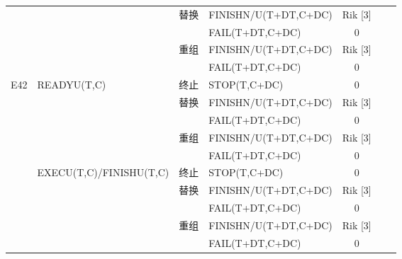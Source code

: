 \begin{table}[htbp]
\begin{tabular}{rrcrcrr}
        \multicolumn{1}{c}{} & \multicolumn{1}{l}{} & \multirow{2}[4]{*}{替换} & \multicolumn{1}{l}{FINISHN/U(T+DT,C+DC)} & Rik  [3] & \multicolumn{1}{c}{\multirow{2}[4]{*}{}} & \multicolumn{1}{c}{\multirow{2}[4]{*}{}} \\
        \multicolumn{1}{c}{} & \multicolumn{1}{l}{} &       & \multicolumn{1}{l}{FAIL(T+DT,C+DC)} & 0     & \multicolumn{1}{c}{} & \multicolumn{1}{c}{} \\
        \multicolumn{1}{c}{} & \multicolumn{1}{l}{} & \multirow{2}[4]{*}{重组} & \multicolumn{1}{l}{FINISHN/U(T+DT,C+DC)} & Rik  [3] & \multicolumn{1}{c}{\multirow{2}[4]{*}{}} & \multicolumn{1}{c}{\multirow{2}[4]{*}{}} \\
        \multicolumn{1}{c}{} & \multicolumn{1}{l}{} &       & \multicolumn{1}{l}{FAIL(T+DT,C+DC)} & 0     & \multicolumn{1}{c}{} & \multicolumn{1}{c}{} \\
        \multicolumn{1}{c}{\multirow{10}[20]{*}{E42}} & \multicolumn{1}{l}{\multirow{5}[10]{*}{READYU(T,C)}} & 终止    & \multicolumn{1}{l}{STOP(T,C+DC)} & 0     &       &  \\
        \multicolumn{1}{c}{} & \multicolumn{1}{l}{} & \multirow{2}[4]{*}{替换} & \multicolumn{1}{l}{FINISHN/U(T+DT,C+DC)} & Rik  [3] & \multicolumn{1}{c}{\multirow{2}[4]{*}{}} & \multicolumn{1}{c}{\multirow{2}[4]{*}{}} \\
        \multicolumn{1}{c}{} & \multicolumn{1}{l}{} &       & \multicolumn{1}{l}{FAIL(T+DT,C+DC)} & 0     & \multicolumn{1}{c}{} & \multicolumn{1}{c}{} \\
        \multicolumn{1}{c}{} & \multicolumn{1}{l}{} & \multirow{2}[4]{*}{重组} & \multicolumn{1}{l}{FINISHN/U(T+DT,C+DC)} & Rik  [3] & \multicolumn{1}{c}{\multirow{2}[4]{*}{}} & \multicolumn{1}{c}{\multirow{2}[4]{*}{}} \\
        \multicolumn{1}{c}{} & \multicolumn{1}{l}{} &       & \multicolumn{1}{l}{FAIL(T+DT,C+DC)} & 0     & \multicolumn{1}{c}{} & \multicolumn{1}{c}{} \\
        \multicolumn{1}{c}{} & \multicolumn{1}{l}{\multirow{5}[10]{*}{EXECU(T,C)/FINISHU(T,C)}} & 终止    & \multicolumn{1}{l}{STOP(T,C+DC)} & 0     &       &  \\
        \multicolumn{1}{c}{} & \multicolumn{1}{l}{} & \multirow{2}[4]{*}{替换} & \multicolumn{1}{l}{FINISHN/U(T+DT,C+DC)} & Rik  [3] & \multicolumn{1}{c}{\multirow{2}[4]{*}{}} & \multicolumn{1}{c}{\multirow{2}[4]{*}{}} \\
        \multicolumn{1}{c}{} & \multicolumn{1}{l}{} &       & \multicolumn{1}{l}{FAIL(T+DT,C+DC)} & 0     & \multicolumn{1}{c}{} & \multicolumn{1}{c}{} \\
        \multicolumn{1}{c}{} & \multicolumn{1}{l}{} & \multirow{2}[4]{*}{重组} & \multicolumn{1}{l}{FINISHN/U(T+DT,C+DC)} & Rik  [3] & \multicolumn{1}{c}{\multirow{2}[4]{*}{}} & \multicolumn{1}{c}{\multirow{2}[4]{*}{}} \\
        \multicolumn{1}{c}{} & \multicolumn{1}{l}{} &       & \multicolumn{1}{l}{FAIL(T+DT,C+DC)} & 0     & \multicolumn{1}{c}{} & \multicolumn{1}{c}{} \\
        \bottomrule
    \end{tabular}%
\end{table}%
